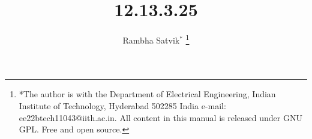 \documentclass[journal,12pt,twocolumn]{IEEEtran}
\theoremstyle{remark}
\begin{document}
%




\vspace{3cm}

\title{12.13.3.25}
\author{ Rambha Satvik$^{*}$%
	\thanks{*The author is with the Department
		of Electrical Engineering, Indian Institute of Technology, Hyderabad
		502285 India e-mail: ee22btech11043@iith.ac.in. All content in this manual is released under GNU GPL.  Free and open source.}
	
}	


%
%
%

% 
%



% 
\end{document}
